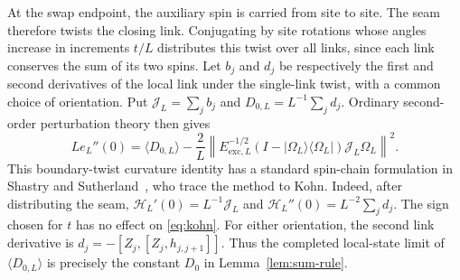 At the swap endpoint, the auxiliary spin is carried from site to site.
The seam therefore twists the closing link. Conjugating by site rotations
whose angles increase in increments \(t/L\) distributes this twist over
all links, since each link conserves the sum of its two spins. Let
\(b_j\) and \(d_j\) be respectively the first and second derivatives of
the local link under the single-link twist, with a common choice of
orientation. Put \(\mathcal J_L=\sum_j b_j\) and
\(D_{0,L}=L^{-1}\sum_j d_j\).
Ordinary second-order perturbation theory then gives
\begin{equation}\label{eq:kohn}
 L e_L''(0)=\langle D_{0,L}\rangle
 -\frac2L
 \left\|E_{\mathrm{exc},L}^{-1/2}
       (I-|\Omega_L\rangle\langle\Omega_L|)\mathcal J_L\Omega_L\right\|^2 .
\end{equation}
This boundary-twist curvature identity has a standard spin-chain
formulation in Shastry and Sutherland~\cite[pp.~243--244]{ShastrySutherland1990},
who trace the method to Kohn.
Indeed, after distributing the seam,
\(\mathcal H_L'(0)=L^{-1}\mathcal J_L\) and
\(\mathcal H_L''(0)=L^{-2}\sum_jd_j\).
The sign chosen for \(t\) has no effect on \eqref{eq:kohn}.
For either orientation, the second link derivative is
\(d_j=-[Z_j,[Z_j,h_{j,j+1}]]\). Thus the completed local-state
limit of \(\langle D_{0,L}\rangle\) is precisely the constant
\(D_0\) in Lemma~\ref{lem:sum-rule}.

